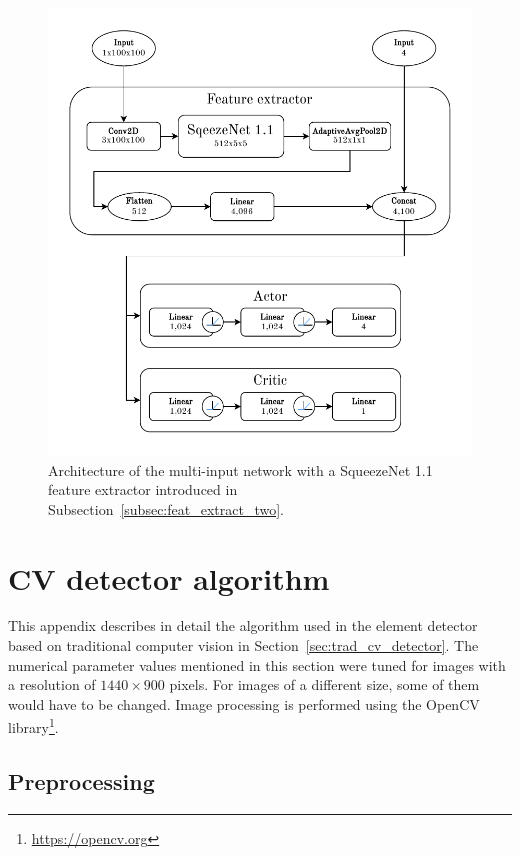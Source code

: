 \documentclass[
  digital,     %
  oneside,     %
  nosansbold,  %
  nocolorbold, %
  lof,         %
  lot,         %
]{fithesis4}
\begin{document}
\begin{figure}
    \includegraphics[width=1\linewidth]{diagrams/squeezenet.pdf}
    \caption{Architecture of the multi-input network with a SqueezeNet 1.1 feature extractor introduced in Subsection~\ref{subsec:feat_extract_two}.}
    \label{fig:squeezenet_arch}
\end{figure}

\chapter{CV detector algorithm}
\label{ap:cv}

This appendix describes in detail the algorithm used in the element detector based on traditional computer vision in Section~\ref{sec:trad_cv_detector}. The numerical parameter values mentioned in this section were tuned for images with a resolution of $1440\times900$ pixels. For images of a different size, some of them would have to be changed. Image processing is performed using the OpenCV library\footnote{\url{https://opencv.org}}.

\section{Preprocessing}
\end{document}
